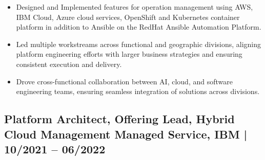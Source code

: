 \documentclass[12pt,]{scrartcl}
\begin{document}
\begin{itemize}
\item Designed and Implemented features for operation management using AWS, IBM Cloud, Azure cloud services, OpenShift and Kubernetes container platform in addition to Ansible on the RedHat Ansible Automation Platform.

    \item Led multiple workstreams across functional and geographic divisions, aligning platform engineering efforts with larger business strategies and ensuring consistent execution and delivery.
\item Drove cross-functional collaboration between AI, cloud, and software engineering teams, ensuring seamless integration of solutions across divisions.
\end{itemize}

\subsection*{Platform Architect, Offering Lead, Hybrid Cloud Management Managed Service, IBM | 10/2021 -- 06/2022}
\end{document}
